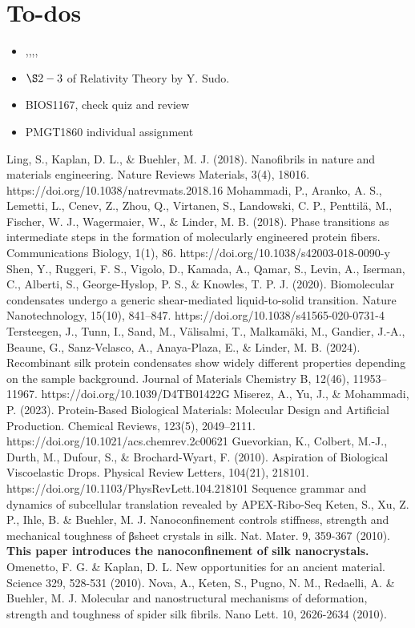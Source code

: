 \documentclass{ltjsarticle}
\numberwithin{equation}{subsection}
\begin{document}
\section{To-dos}
\begin{itemize}
    \item \cite{guevorkian},\cite{kkyogo},\cite{keten},\cite{omenetto},\cite{nova}
    \item $\S 2-3$ of Relativity Theory by Y. Sudo. 
    \item BIOS1167, check quiz and review
    \item PMGT1860 individual assignment
\end{itemize}
\begin{thebibliography}{9}
    Ling, S., Kaplan, D. L., \& Buehler, M. J. (2018). Nanofibrils in nature and materials engineering. Nature Reviews Materials, 3(4), 18016. https://doi.org/10.1038/natrevmats.2018.16
     Mohammadi, P., Aranko, A. S., Lemetti, L., Cenev, Z., Zhou, Q., Virtanen, S., Landowski, C. P., Penttilä, M., Fischer, W. J., Wagermaier, W., \& Linder, M. B. (2018). Phase transitions as intermediate steps in the formation of molecularly engineered protein fibers. Communications Biology, 1(1), 86. https://doi.org/10.1038/s42003-018-0090-y
 Shen, Y., Ruggeri, F. S., Vigolo, D., Kamada, A., Qamar, S., Levin, A., Iserman, C., Alberti, S., George-Hyslop, P. S., \& Knowles, T. P. J. (2020). Biomolecular condensates undergo a generic shear-mediated liquid-to-solid transition. Nature Nanotechnology, 15(10), 841–847. https://doi.org/10.1038/s41565-020-0731-4
 Tersteegen, J., Tunn, I., Sand, M., Välisalmi, T., Malkamäki, M., Gandier, J.-A., Beaune, G., Sanz-Velasco, A., Anaya-Plaza, E., \& Linder, M. B. (2024). Recombinant silk protein condensates show widely different properties depending on the sample background. Journal of Materials Chemistry B, 12(46), 11953–11967. https://doi.org/10.1039/D4TB01422G
Miserez, A., Yu, J., \& Mohammadi, P. (2023). Protein-Based Biological Materials: Molecular Design and Artificial Production. Chemical Reviews, 123(5), 2049–2111. https://doi.org/10.1021/acs.chemrev.2c00621
Guevorkian, K., Colbert, M.-J., Durth, M., Dufour, S., \& Brochard-Wyart, F. (2010). Aspiration of Biological Viscoelastic Drops. Physical Review Letters, 104(21), 218101. https://doi.org/10.1103/PhysRevLett.104.218101
Sequence grammar and dynamics of subcellular translation revealed by APEX-Ribo-Seq
 Keten, S., Xu, Z. P., Ihle, B. \& Buehler, M. J. Nanoconfinement controls stiffness, strength and mechanical toughness of βsheet crystals in silk. Nat. Mater. 9, 359-367 (2010).  \textbf{This paper introduces the nanoconfinement of silk nanocrystals.}
 Omenetto, F. G. \& Kaplan, D. L. New opportunities for an ancient material. Science 329, 528-531 (2010).
 Nova, A., Keten, S., Pugno, N. M., Redaelli, A. \& Buehler, M. J. Molecular and nanostructural mechanisms of deformation, strength and toughness of spider silk fibrils. Nano Lett. 10, 2626-2634 (2010).
\end{thebibliography}
\end{document}
